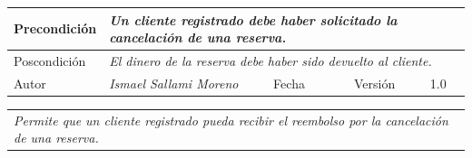 \begin{table}[H]
\begin{tabular}{llllllll}
    \multicolumn{1}{|l|}{Precondición}                           & \multicolumn{7}{p{10cm}|}{{\color[HTML]{808080} \textit{Un cliente registrado debe haber solicitado la cancelación de una reserva.}}}                                                                                                                                                                                                                                   \\ \hline
    \multicolumn{1}{|l|}{Poscondición}                           & \multicolumn{7}{p{10cm}|}{{\color[HTML]{808080} \textit{El dinero de la reserva debe haber sido devuelto al cliente.}}}                                                                                                                                                                                                                                                       \\ \hline
    \multicolumn{1}{|l|}{Autor}                                  & \multicolumn{1}{l|}{{\color[HTML]{808080} \textit{Ismael Sallami Moreno}}}                           & \multicolumn{2}{l|}{Fecha}                                                   & \multicolumn{1}{l|}{}                          & \multicolumn{2}{l|}{Versión}                                                      & \multicolumn{1}{l|}{1.0}                                                     \\ \hline
    \end{tabular}
\end{table}

\begin{table}[H]
    \begin{tabular}{llllllll}
    \rowcolor[HTML]{E6E6E6} %
    \multicolumn{8}{|l|}{\cellcolor[HTML]{F2F2F2}Propósito}                                                                                                                                                                                                                                                                                                                                                                                           \\ \hline
    \multicolumn{8}{|p{15cm}|}{{\color[HTML]{808080} \textit{Permite que un cliente registrado pueda recibir el reembolso por la cancelación de una reserva.}}}                                                                                                                                                                                                             \\ \hline
    \end{tabular}
\end{table}

